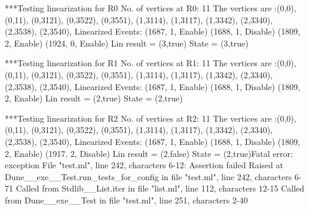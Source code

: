 ***Testing linearization for R0
No. of vertices at R0: 11
The vertices are :(0,0), (0,11), (0,3121), (0,3522), (0,3551), (1,3114), (1,3117), (1,3342), (2,3340), (2,3538), (2,3540), 
Linearized Events:
(1687, 1, Enable)
(1688, 1, Disable)
(1809, 2, Enable)
(1924, 0, Enable)
Lin result = (3,true)
State = (3,true)

***Testing linearization for R1
No. of vertices at R1: 11
The vertices are :(0,0), (0,11), (0,3121), (0,3522), (0,3551), (1,3114), (1,3117), (1,3342), (2,3340), (2,3538), (2,3540), 
Linearized Events:
(1687, 1, Enable)
(1688, 1, Disable)
(1809, 2, Enable)
Lin result = (2,true)
State = (2,true)

***Testing linearization for R2
No. of vertices at R2: 11
The vertices are :(0,0), (0,11), (0,3121), (0,3522), (0,3551), (1,3114), (1,3117), (1,3342), (2,3340), (2,3538), (2,3540), 
Linearized Events:
(1687, 1, Enable)
(1688, 1, Disable)
(1809, 2, Enable)
(1917, 2, Disable)
Lin result = (2,false)
State = (2,true)Fatal error: exception File "test.ml", line 242, characters 6-12: Assertion failed
Raised at Dune__exe__Test.run_tests_for_config in file "test.ml", line 242, characters 6-71
Called from Stdlib__List.iter in file "list.ml", line 112, characters 12-15
Called from Dune__exe__Test in file "test.ml", line 251, characters 2-40